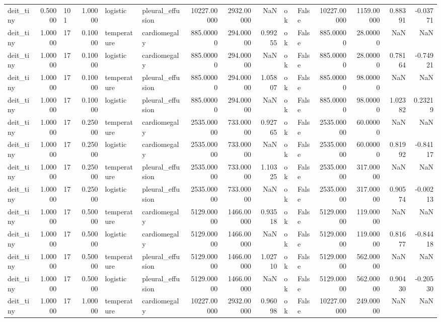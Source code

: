 \begin{tabular}{lrlrllrrrllrrrr}
deit\_tiny & 0.50000 & 101 & 1.00000 & logistic & pleural\_effusion & 10227.00000 & 2932.00000 & NaN & ok & False & 10227.00000 & 1159.00000 & 0.88391 & -0.03771 \\
deit\_tiny & 1.00000 & 17 & 0.10000 & temperature & cardiomegaly & 885.00000 & 294.00000 & 0.99255 & ok & False & 885.00000 & 28.00000 & NaN & NaN \\
deit\_tiny & 1.00000 & 17 & 0.10000 & logistic & cardiomegaly & 885.00000 & 294.00000 & NaN & ok & False & 885.00000 & 28.00000 & 0.78164 & -0.74921 \\
deit\_tiny & 1.00000 & 17 & 0.10000 & temperature & pleural\_effusion & 885.00000 & 294.00000 & 1.05807 & ok & False & 885.00000 & 98.00000 & NaN & NaN \\
deit\_tiny & 1.00000 & 17 & 0.10000 & logistic & pleural\_effusion & 885.00000 & 294.00000 & NaN & ok & False & 885.00000 & 98.00000 & 1.02382 & 0.23219 \\
deit\_tiny & 1.00000 & 17 & 0.25000 & temperature & cardiomegaly & 2535.00000 & 733.00000 & 0.92765 & ok & False & 2535.00000 & 60.00000 & NaN & NaN \\
deit\_tiny & 1.00000 & 17 & 0.25000 & logistic & cardiomegaly & 2535.00000 & 733.00000 & NaN & ok & False & 2535.00000 & 60.00000 & 0.81992 & -0.84117 \\
deit\_tiny & 1.00000 & 17 & 0.25000 & temperature & pleural\_effusion & 2535.00000 & 733.00000 & 1.10325 & ok & False & 2535.00000 & 317.00000 & NaN & NaN \\
deit\_tiny & 1.00000 & 17 & 0.25000 & logistic & pleural\_effusion & 2535.00000 & 733.00000 & NaN & ok & False & 2535.00000 & 317.00000 & 0.90574 & -0.00213 \\
deit\_tiny & 1.00000 & 17 & 0.50000 & temperature & cardiomegaly & 5129.00000 & 1466.00000 & 0.93518 & ok & False & 5129.00000 & 119.00000 & NaN & NaN \\
deit\_tiny & 1.00000 & 17 & 0.50000 & logistic & cardiomegaly & 5129.00000 & 1466.00000 & NaN & ok & False & 5129.00000 & 119.00000 & 0.81677 & -0.84418 \\
deit\_tiny & 1.00000 & 17 & 0.50000 & temperature & pleural\_effusion & 5129.00000 & 1466.00000 & 1.02710 & ok & False & 5129.00000 & 562.00000 & NaN & NaN \\
deit\_tiny & 1.00000 & 17 & 0.50000 & logistic & pleural\_effusion & 5129.00000 & 1466.00000 & NaN & ok & False & 5129.00000 & 562.00000 & 0.90430 & -0.20530 \\
deit\_tiny & 1.00000 & 17 & 1.00000 & temperature & cardiomegaly & 10227.00000 & 2932.00000 & 0.96098 & ok & False & 10227.00000 & 249.00000 & NaN & NaN \\

\end{tabular}
